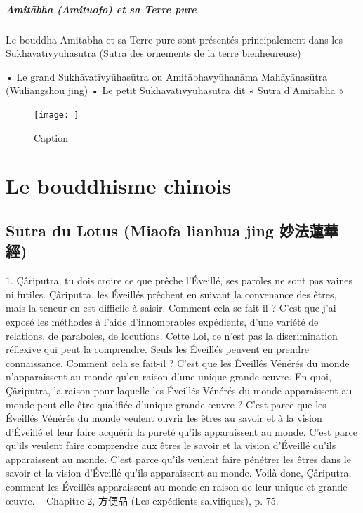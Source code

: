 \paragraph{Amitābha (Amituofo) et sa Terre pure}

Le bouddha Amitabha et sa Terre pure sont présentés principalement dans les Sukhāvatīvyūhasūtra (Sūtra des ornements de la terre bienheureuse)

•	Le grand Sukhāvatīvyūhasūtra ou Amitābhavyūhanāma Mahāyānasūtra (Wuliangshou jing)
•	Le petit Sukhāvatīvyūhasūtra dit « Sutra d’Amitabha »

\begin{figure}
    \centering
    \texttt{[image: ]}
    \caption{Caption}
    \label{fig:enter-label}
\end{figure}

\chapter{Le bouddhisme chinois}



\section{Sūtra du Lotus (Miaofa lianhua jing 妙法蓮華經)}



\begin{singlequote}
    1.	Çâriputra, tu dois croire ce que prêche l’Éveillé, ses paroles ne sont pas vaines ni futiles. Çâriputra, les Éveillés prêchent en suivant la convenance des êtres, mais la teneur en est difficile à saisir. Comment cela se fait-il ? C’est que j’ai exposé les méthodes à l’aide d’innombrables expédients, d’une variété de relations, de paraboles, de locutions. Cette Loi, ce n’est pas la discrimination réflexive qui peut la comprendre. Seuls les Éveillés peuvent en prendre connaissance. Comment cela se fait-il ? C’est que les Éveillés Vénérés du monde n’apparaissent au monde qu’en raison d’une unique grande œuvre. En quoi, Çâriputra, la raison pour laquelle les Éveillés Vénérés du monde apparaissent au monde peut-elle être qualifiée d’unique grande œuvre ?
C’est parce que les Éveillés Vénérés du monde veulent ouvrir les êtres au savoir et à la vision d’Éveillé et leur faire acquérir la pureté qu’ils apparaissent au monde.
C’est parce qu’ils veulent faire comprendre aux êtres le savoir et la vision d’Éveillé qu’ils apparaissent au monde.
C’est parce qu’ils veulent faire pénétrer les êtres dans le savoir et la vision d’Éveillé qu’ils apparaissent au monde.
Voilà donc, Çâriputra, comment les Éveillés apparaissent au monde en raison de leur unique et grande œuvre.
-- Chapitre 2, 方便品 (Les expédients salvifiques), p. 75.
\end{singlequote}

